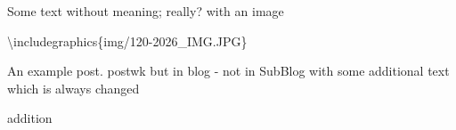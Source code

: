\documentclass[a4paper,10pt]{scrbook}
\begin{document}
Some text without meaning; really? with an image

\textbackslash includegraphics\{img/120-2026\_IMG.JPG\}

An example post. postwk but in blog - not in SubBlog with some
additional text which is always changed

addition

\printindex
\end{document}
